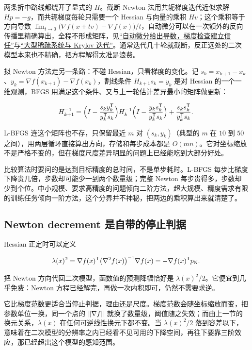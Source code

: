 两条折中路线都绕开了显式的 \(H\)。截断 Newton 法用共轭梯度迭代近似求解 \(Hp=-g\)，而共轭梯度每轮只需要一个 Hessian 与向量的乘积 \(Hv\)；这个乘积等于方向导数 \(\lim_{t\to0}\bigl(\nabla f(x+tv)-\nabla f(x)\bigr)/t\)，自动微分可以在一次额外的反向传播里精确算出，全程不形成矩阵，见\hyperref[sec:08-Numerical-Analysis/07-Numerical-Methods-for-ML/02]{``自动微分给出导数，梯度检查建立信任''}与\hyperref[sec:08-Numerical-Analysis/05-Numerical-Linear-Algebra/04]{``大型稀疏系统与 Krylov 迭代''}。通常迭代几十轮就截断，反正远处的二次模型本来也不精确，把方程解得太准是浪费。

拟 Newton 方法走另一条路：不碰 Hessian，只看梯度的变化。记 \(s_k=x_{k+1}-x_k\)、\(y_k=\nabla f(x_{k+1})-\nabla f(x_k)\)，割线条件 \(H_{k+1}s_k=y_k\) 是对 Hessian 的一个一维观测，BFGS 用满足这个条件、又与上一轮估计差异最小的矩阵做更新：

\[
H_{k+1}^{-1}
=\Bigl(I-\frac{s_ky_k^{\mathsf{T}}}{y_k^{\mathsf{T}}s_k}\Bigr)H_k^{-1}
\Bigl(I-\frac{y_ks_k^{\mathsf{T}}}{y_k^{\mathsf{T}}s_k}\Bigr)
+\frac{s_ks_k^{\mathsf{T}}}{y_k^{\mathsf{T}}s_k}.
\]

L-BFGS 连这个矩阵也不存，只保留最近 \(m\) 对 \((s_k,y_k)\)（典型的 \(m\) 在 \(10\) 到 \(50\) 之间），用两层循环直接算出方向，存储和每步成本都是 \(O(mn)\)。它对坐标缩放不是严格不变的，但在梯度尺度差异明显的问题上已经能吃到大部分好处。

比较算法时要问的是达到目标精度的总时间，不是单步耗时。L-BFGS 每步比梯度下降贵几倍，步数却可能少一到两个数量级；完整 Newton 每步贵得多，步数却少到个位。中小规模、要求高精度的问题倾向二阶方法，超大规模、精度需求有限的训练任务倾向一阶方法，这个分界并不神秘，把两边的乘积算出来就清楚了。

\subsection{Newton decrement 是自带的停止判据}

Hessian 正定时可以定义

\[
\lambda(x)^2=\nabla f(x)^{\mathsf{T}}\bigl(\nabla^2f(x)\bigr)^{-1}\nabla f(x)
=-\nabla f(x)^{\mathsf{T}}p_{\mathrm N}.
\]

把 Newton 方向代回二次模型，函数值的预测降幅恰好是 \(\lambda(x)^2/2\)。它便宜到几乎免费：Newton 方程已经解完，再做一次内积即可，仍然不需要求逆。

它比梯度范数更适合当停止判据，理由还是尺度。梯度范数会随坐标缩放而变，把参数单位一换，同一个点的 \(\left\lVert\nabla f\right\rVert\) 就换了数量级，阈值随之失效；而由上一节的换元关系，\(\lambda(x)\) 在任何可逆线性换元下都不变。当 \(\lambda(x)^2/2\) 落到容差以下，意味着在二次模型的分辨率之内已经看不见可用的下降空间，再往下要靠三阶效应，那已经超出这个模型的感知范围。

